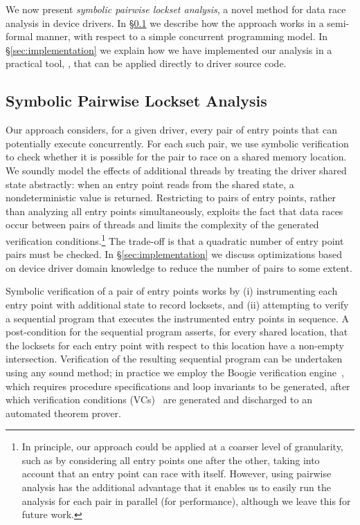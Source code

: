 
We now present \emph{symbolic pairwise lockset analysis}, a novel method for data race analysis in device drivers.  In \S\ref{sec:symbolicpairwise} we describe how the approach works in a semi-formal manner, with respect to a simple concurrent programming model.  In \S\ref{sec:implementation} we explain how we have implemented our analysis in a practical tool, \whoop, that can be applied directly to driver source code.

\subsection{Symbolic Pairwise Lockset Analysis}
\label{sec:symbolicpairwise}

Our approach considers, for a given driver, every pair of entry points that can potentially execute concurrently.  For each such pair, we use symbolic verification to check whether it is possible for the pair to race on a shared memory location. We soundly model the effects of additional threads by treating the driver shared state abstractly: when an entry point reads from the shared state, a nondeterministic value is returned.  Restricting to pairs of entry points, rather than analyzing all entry points simultaneously, exploits the fact that data races occur between pairs of threads and limits the complexity of the generated verification conditions.\footnote{In principle, our approach could be applied at a coarser level of granularity, such as by considering all entry points one after the other, taking into account that an entry point can race with itself. However, using pairwise analysis has the additional advantage that it enables us to easily run the analysis for each pair in parallel (for performance), although we leave this for future work.}
%
The trade-off is that a quadratic number of entry point pairs must be checked.  In \S\ref{sec:implementation} we discuss optimizations based on device driver domain knowledge to reduce the number of pairs to some extent.

Symbolic verification of a pair of entry points works by (i) instrumenting each entry point with additional state to record locksets, and (ii) attempting to verify a sequential program that executes the instrumented entry points in sequence.  A post-condition for the sequential program asserts, for every shared location, that the locksets for each entry point with respect to this location have a non-empty intersection.  Verification of the resulting sequential program can be undertaken using any sound method; in practice we employ the Boogie verification engine~\cite{barnett2006boogie}, which requires procedure specifications and loop invariants to be generated, after which verification conditions (VCs)~\cite{barnett2005weakest} are generated and discharged to an automated theorem prover.

